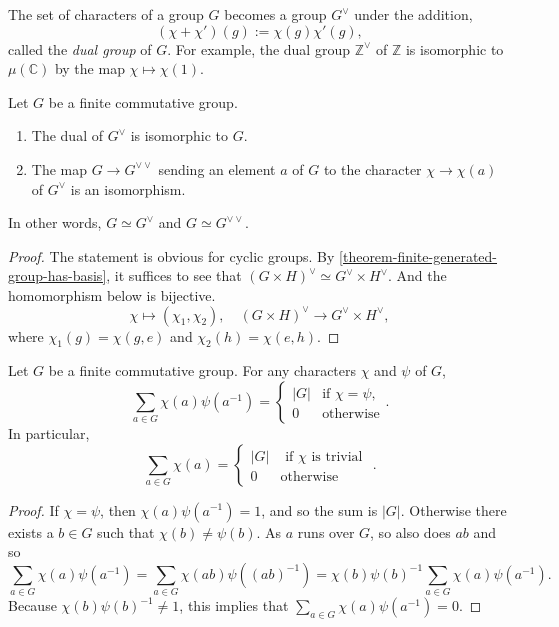 \begin{definition}
  \label{definition-dual-group}
  The set of characters of a group \( G \) becomes a group \( G^\vee \) under the addition,
  \[
    (\chi + \chi')(g) := \chi(g) \chi'(g),
  \]
  called the \emph{dual group} of \( G \).
  For example, the dual group \( \mathbb{Z}^\vee \) of \( \mathbb{Z} \) is isomorphic to \( \mu(\mathbb{C}) \) by the map \( \chi \mapsto \chi(1) \).
\end{definition}

\begin{theorem}
  \label{theorem-duality-of-finite-commutative-group}
  Let \( G \) be a finite commutative group.
  \begin{enumerate}
    \item The dual of \( G^\vee \) is isomorphic to \( G \).
    \item The map \( G \to G^{\vee\vee} \) sending an element \( a \) of \( G \) to the character \( \chi \to \chi(a) \) of \( G^{\vee} \) is an isomorphism.
  \end{enumerate}
  In other words, \( G \simeq G^\vee \) and \( G \simeq G^{\vee\vee} \).
\end{theorem}
\begin{proof}
  The statement is obvious for cyclic groups.
  By \ref{theorem-finite-generated-group-has-basis}, it suffices to see that \( (G \times H)^{\vee} \simeq G^{\vee} \times H^{\vee} \).
  And the homomorphism below is bijective.
  \[
    \chi \mapsto (\chi_1, \chi_2),\quad (G \times H)^{\vee} \to G^\vee \times H^\vee,
  \]
  where \( \chi_1(g) = \chi(g, e) \) and \( \chi_2(h) = \chi(e, h) \).
\end{proof}

\begin{theorem}
  \label{theorem-orthogonality-relation}
  Let \( G \) be a finite commutative group.
  For any characters \( \chi \) and \( \psi \) of \( G \),
  \[
    \sum_{a \in G} \chi(a) \psi(a^{-1}) =
    \begin{cases}
      \left\vert G \right\vert & \text{if } \chi = \psi,\\
      0 &\text{otherwise}
    \end{cases}.
  \]
  In particular,
  \[
    \sum_{a \in G} \chi(a) = \begin{cases}
      \left\vert G \right\vert & \text{ if } \chi \text{ is trivial }\\
      0 & \text{otherwise}
    \end{cases}.
  \]
\end{theorem}
\begin{proof}
  If \( \chi = \psi \), then \( \chi(a) \psi(a^{-1}) = 1 \), and so the sum is \( \left\vert G \right\vert \).
  Otherwise there exists a \( b \in G \) such that \( \chi(b) \neq \psi(b) \).
  As \( a \) runs over \( G \), so also does \( ab \) and so
  \[
    \sum_{a \in G} \chi(a) \psi(a^{-1}) = \sum_{a \in G} \chi(ab) \psi((ab)^{-1}) = \chi(b)\psi(b)^{-1}\sum_{a \in G}\chi(a)\psi(a^{-1}).
  \]
  Because \( \chi(b)\psi(b)^{-1} \neq 1 \), this implies that \( \sum_{a \in G} \chi(a) \psi(a^{-1}) = 0 \).
\end{proof}

